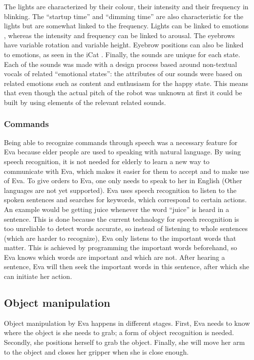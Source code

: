 \documentclass[project_eva.tex]{subfiles}
\begin{document}
The lights are characterized by their colour, their intensity and their frequency in blinking. The ``startup time'' and 
``dimming time'' are also characteristic for the lights but are somewhat linked to the frequency. Lights can be linked to 
emotions \cite{colour-emotion} , whereas the intensity and frequency can be linked to arousal. The eyebrows have variable 
rotation and variable height. Eyebrow positions can also be linked to emotions, as seen in the iCat \cite{iCat}. Finally, 
the sounds are unique for each state. Each of the sounds was made with a design process based around non-textual vocals 
of related ``emotional states'': the attributes of our sounds were based on related emotions  such as content and 
enthusiasm for the happy state. This means that even though the actual pitch of the robot was unknown at first it could 
be built by using elements \cite{sounds} of the relevant related sounds.


\subsubsection*{Commands}
Being able to recognize commands through speech was a necessary feature for Eva because elder people are used to speaking 
with natural language. By using speech recognition, it is not needed for elderly to learn a new way to communicate with 
Eva, which makes it easier for them to accept and to make use of Eva. To give orders to Eva, one only needs to speak to 
her in English (Other languages are not yet supported). Eva uses speech recognition to listen to the spoken sentences and 
searches for keywords, which correspond to certain actions. An example would be getting juice whenever the word ``juice'' 
is heard in a sentence. This is done because the current technology for speech recognition is too unreliable to detect 
words accurate, so instead of listening to whole sentences (which are harder to recognize), Eva only listens to the 
important words that matter. This is achieved by programming the important words beforehand, so Eva knows which words are important and which are not. After hearing a sentence, Eva will then seek the important words in this sentence, after which she can initiate her action.

\subsection*{Object manipulation}
Object manipulation by Eva happens in different stages. First, Eva needs to know where the object is she needs to grab; a 
form of object recognition is needed. Secondly, she  positions herself to grab the object. Finally, she will move her 
arm to the object and closes her gripper when she is close enough.
\end{document}
